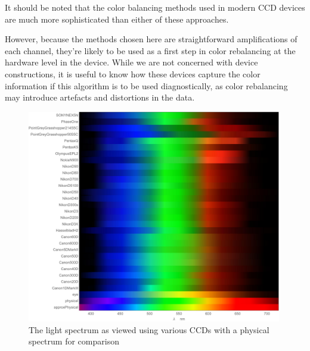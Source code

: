 It should be noted that the color balancing methods used in modern CCD devices are much more sophisticated than either of these approaches.

However, because the methods chosen here are straightforward amplifications of each channel, they're likely to be used as a first step in color rebalancing at the hardware level in the device. While we are not concerned with device constructions, it is useful to know how these devices capture the color information if this algorithm is to be used diagnostically, as color rebalancing may introduce artefacts and distortions in the data.


\begin{figure}[h!]
  \centering
    \includegraphics[width=0.99\textwidth]{Chapter1/Figs/ResponseSpectraStripes.jpg}
    \caption{The light spectrum as viewed using various CCDs with a physical spectrum for comparison }  \label{fig:ResponseSpectraStripes}
\end{figure}


